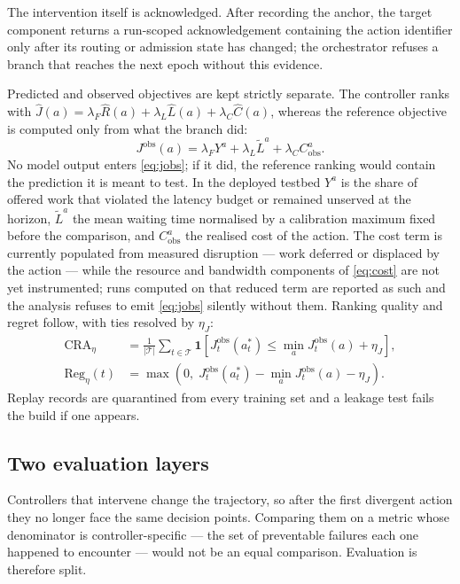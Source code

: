 \documentclass[journal]{IEEEtran}
\begin{document}
The intervention itself is acknowledged. After recording the anchor, the target
component returns a run-scoped acknowledgement containing the action identifier
only after its routing or admission state has changed; the orchestrator refuses
a branch that reaches the next epoch without this evidence.

Predicted and observed objectives are kept strictly separate. The controller
ranks with $\hat{J}(a)=\lambda_F\hat{R}(a)+\lambda_L\hat{L}(a)
+\lambda_C\hat{C}(a)$, whereas the reference objective is computed only from what
the branch did:
\begin{equation}
J^{\mathrm{obs}}(a)=\lambda_F Y^{a}+\lambda_L\tilde{L}^{a}
+\lambda_C C^{a}_{\mathrm{obs}}.
\label{eq:jobs}
\end{equation}
No model output enters \eqref{eq:jobs}; if it did, the reference ranking would
contain the prediction it is meant to test. In the deployed testbed $Y^{a}$ is
the share of offered work that violated the latency budget or remained unserved
at the horizon, $\tilde{L}^{a}$ the mean waiting time normalised by a
calibration maximum fixed before the comparison, and $C^{a}_{\mathrm{obs}}$ the
realised cost of the action. The cost term is currently populated from measured
disruption --- work deferred or displaced by the action --- while the resource
and bandwidth components of \eqref{eq:cost} are not yet instrumented; runs
computed on that reduced term are reported as such and the analysis refuses to
emit \eqref{eq:jobs} silently without them. Ranking quality and regret follow,
with ties resolved by $\eta_J$:
\begin{align}
\mathrm{CRA}_\eta&=\frac{1}{|\mathcal{T}|}\sum_{t\in\mathcal{T}}
\mathbf{1}\!\left[J^{\mathrm{obs}}_t(a^{*}_t)\le
\min_{a}J^{\mathrm{obs}}_t(a)+\eta_J\right],
\label{eq:cra}\\
\mathrm{Reg}_\eta(t)&=\max\!\left(0,\;J^{\mathrm{obs}}_t(a^{*}_t)
-\min_{a}J^{\mathrm{obs}}_t(a)-\eta_J\right).
\label{eq:regret}
\end{align}
Replay records are quarantined from every training set and a leakage test fails
the build if one appears.

\subsection{Two evaluation layers}
Controllers that intervene change the trajectory, so after the first divergent
action they no longer face the same decision points. Comparing them on a metric
whose denominator is controller-specific --- the set of preventable failures each
one happened to encounter --- would not be an equal comparison. Evaluation is
therefore split.
\end{document}
